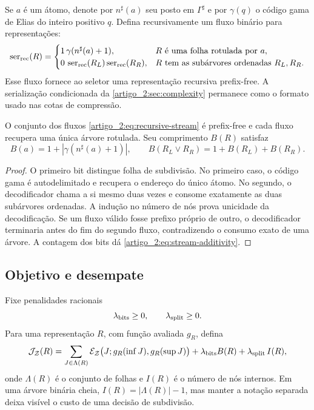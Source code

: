 Se $a$ é um átomo, denote por $n^\sharp(a)$ seu posto em $\Gamma^\sharp$ e
por $\gamma(q)$ o código gama de Elias do inteiro positivo $q$. Defina
recursivamente um fluxo binário para representações:
\begin{equation}
 \operatorname{ser}_{\rm rec}(R)=
 \begin{cases}
 1\,\gamma(n^\sharp(a)+1),&R\text{ é uma folha rotulada por }a,\\
 0\,\operatorname{ser}_{\rm rec}(R_L)\operatorname{ser}_{\rm rec}(R_R),
 &R\text{ tem as subárvores ordenadas }R_L,R_R.
 \end{cases}
 \label{artigo_2:eq:recursive-stream}
\end{equation}
Esse fluxo fornece ao seletor uma representação recursiva prefix-free. A
serialização condicionada da \cref{artigo_2:sec:complexity} permanece como o formato
usado nas cotas de compressão.

\begin{lemma}\label{map:artigo_2:5.1}
\label{artigo_2:lem:recursive-stream}
O conjunto dos fluxos \eqref{artigo_2:eq:recursive-stream} é prefix-free e cada fluxo
recupera uma única árvore rotulada. Seu comprimento $B(R)$ satisfaz
\begin{equation}
 B(a)=1+|\gamma(n^\sharp(a)+1)|,\qquad
 B(R_L\vee R_R)=1+B(R_L)+B(R_R).
 \label{artigo_2:eq:stream-additivity}
\end{equation}
\end{lemma}

\begin{proof}
O primeiro bit distingue folha de subdivisão. No primeiro caso, o código gama
é autodelimitado e recupera o endereço do único átomo. No segundo, o
decodificador chama a si mesmo duas vezes e consome exatamente as duas
subárvores ordenadas. A indução no número de nós prova unicidade da
decodificação. Se um fluxo válido fosse prefixo próprio de outro, o
decodificador terminaria antes do fim do segundo fluxo, contradizendo o
consumo exato de uma árvore. A contagem dos bits dá
\eqref{artigo_2:eq:stream-additivity}.
\end{proof}

\subsection{Objetivo e desempate}

Fixe penalidades racionais
\[
 \lambda_{\rm bits}\ge0,\qquad \lambda_{\rm split}\ge0.
\]
Para uma representação $R$, com função avaliada $g_R$, defina
\begin{equation}
 \mathcal{J}_{\mathcal Z}(R)
 =\sum_{J\in\Lambda(R)}
   \mathcal{E}_{\mathcal Z}\bigl(J;g_R(\inf J),g_R(\sup J)\bigr)
 +\lambda_{\rm bits}B(R)
 +\lambda_{\rm split}\,I(R),
 \label{artigo_2:eq:additive-objective}
\end{equation}
onde $\Lambda(R)$ é o conjunto de folhas e $I(R)$ é o número de nós internos.
Em uma árvore binária cheia, $I(R)=|\Lambda(R)|-1$, mas manter a notação
separada deixa visível o custo de uma decisão de subdivisão.

